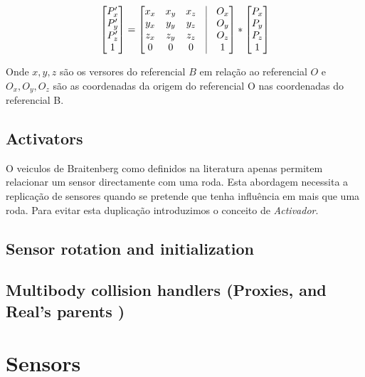 \documentclass[a4paper]{article}
\begin{document}
\[
 	\begin{bmatrix}
		P_{x}' \\
		P_{y}' \\
		P_{z}' \\
		1 
	\end{bmatrix}
	=
	\begin{bmatrix}
		x_{x} & x_{y} & x_{z} & \vline & O_{x}	\\
		y_{x} & y_{y} & y_{z} & \vline & O_{y}	\\
		z_{x} & z_{y} & z_{z} & \vline & O_{z}	\\
		0 & 0 & 0 & \vline & 1 	\\
	\end{bmatrix}
	*
 	\begin{bmatrix}
		P_{x} \\
		P_{y} \\
		P_{z} \\
		1 
	\end{bmatrix}
\]

Onde $x, y, z$ são os versores do referencial $B$ em relação ao referencial $O$ e $O_{x}, O_{y}, O_{z}$ são as coordenadas da origem do referencial O nas coordenadas do referencial B. 

\cleardoublepage
\subsection{Activators}
\indent \indent O veiculos de Braitenberg como definidos na literatura apenas permitem relacionar um sensor directamente com uma roda.
Esta abordagem necessita a replicação de sensores quando se pretende que tenha influência em mais que uma roda.
Para evitar esta duplicação introduzimos o conceito de \emph{Activador}. 


\subsection{Sensor rotation and initialization}
\indent \indent 

\subsection{Multibody collision handlers (Proxies, and Real's parents )}
\indent \indent

\cleardoublepage
\section{Sensors}
\end{document}
